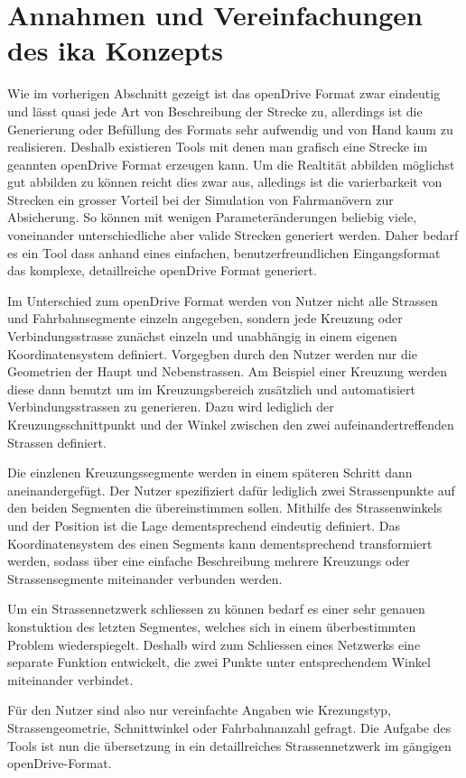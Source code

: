 \chapter{Annahmen und Vereinfachungen des ika Konzepts}
Wie im vorherigen Abschnitt gezeigt ist das openDrive Format zwar eindeutig und lässt quasi jede Art von Beschreibung der Strecke zu, allerdings ist die Generierung oder Befüllung des Formats sehr aufwendig und von Hand kaum zu realisieren. Deshalb existieren Tools mit denen man grafisch eine Strecke im geannten openDrive Format erzeugen kann. Um die Realtität abbilden möglichst gut abbilden zu können reicht dies zwar aus, alledings ist die varierbarkeit von Strecken ein grosser Vorteil bei der Simulation von Fahrmanövern zur Absicherung. So können mit wenigen Parameteränderungen beliebig viele, voneinander unterschiedliche aber valide Strecken generiert werden. Daher bedarf es ein Tool dass anhand eines einfachen, benutzerfreundlichen Eingangsformat das komplexe, detaillreiche openDrive Format generiert.

Im Unterschied zum openDrive Format werden von Nutzer nicht alle Strassen und Fahrbahnsegmente einzeln angegeben, sondern jede Kreuzung oder Verbindungsstrasse zunächst einzeln und unabhängig in einem eigenen Koordinatensystem definiert. Vorgegben durch den Nutzer werden nur die Geometrien der Haupt und Nebenstrassen. Am Beispiel einer Kreuzung werden diese dann benutzt um im Kreuzungsbereich zusätzlich und automatisiert Verbindungsstrassen zu generieren. Dazu wird lediglich der Kreuzungsschnittpunkt und der Winkel zwischen den zwei aufeinandertreffenden Strassen definiert. 

Die einzlenen Kreuzungssegmente werden in einem späteren Schritt dann aneinandergefügt. Der Nutzer spezifiziert dafür lediglich zwei Strassenpunkte auf den beiden Segmenten die übereinstimmen sollen. Mithilfe des Strassenwinkels und der Position ist die Lage dementsprechend eindeutig definiert. Das Koordinatensystem des einen Segments kann dementsprechend transformiert werden, sodass über eine einfache Beschreibung mehrere Kreuzungs oder Strassensegmente miteinander verbunden werden.

Um ein Strassennetzwerk schliessen zu können bedarf es einer sehr genauen konstuktion des letzten Segmentes, welches sich in einem überbestimmten Problem wiederspiegelt. Deshalb wird zum Schliessen eines Netzwerks eine separate Funktion entwickelt, die zwei Punkte unter entsprechendem Winkel miteinander verbindet.

Für den Nutzer sind also nur vereinfachte Angaben wie Krezungstyp, Strassengeometrie, Schnittwinkel oder Fahrbahnanzahl gefragt. Die Aufgabe des Tools ist nun die übersetzung in ein detaillreiches Strassennetzwerk im gängigen openDrive-Format.

